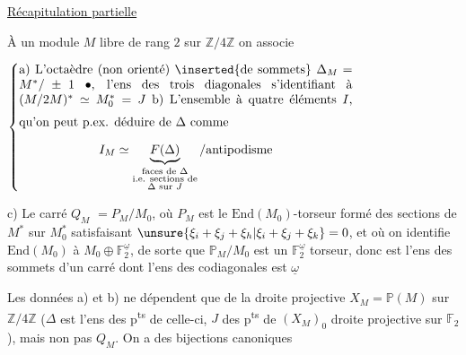\uline{Récapitulation partielle}

À un module $M$ libre de rang $2$ sur $\mathbb Z/4\mathbb Z$ on associe

\noindent{}\(\left\{\begin{minipage}{.77\linewidth}
a) L'octaèdre (non orienté) \inserted{de sommets} $\Delta_M=M^*/\pm1\ \bullet$, l'ens des trois diagonales s'identifiant à $(M/2M)^*\simeq M_0^*=J$

\medskip b) L'ensemble à quatre éléments $I$, qu'on peut p.ex. déduire de $\Delta$ comme
\[
 I_M\simeq\underbrace{F(\Delta)}_{\substack{\text{faces de }\Delta\\\text{i.e. sections de}\\\Delta\text{ sur }J}}/\text{antipodisme}
\]
\end{minipage}\right.\)

\reversemarginpar{}\normalmarginpar


\noindent\makebox[0pt][r]{\rule[-1.4ex]{.4pt}{4.6ex}\quad}c) Le carré $Q_M$   $=P_M/M_0$, où $P_M$ est le $\mathrm{End}(M_0)$-torseur formé des sections de $M^*$ sur $M_0^*$ satisfaisant $\unsure{\xi_i+\xi_j+\xi_h|\xi_i+\xi_j+\xi_k}=0$, et où on identifie $\mathrm{End}(M_0)$ à $M_0\oplus\mathbb F_2^{\underline\omega}$, de sorte que $\mathbb P_M/M_0$ est un $\mathbb F_2^{\underline\omega}$ torseur, donc est l'ens des sommets d'un carré  dont l'ens des codiagonales est $\underline\omega$

\reversemarginpar{}\normalmarginpar

Les données a) et b) ne dépendent que de la  droite projective $X_M=\mathbb P(M)$ sur $\mathbb Z/4\mathbb Z$ ($\Delta$ est l'ens des p\textsuperscript{ts} de celle-ci, $J$  des p\textsuperscript{ts} de $(X_M)_0$ droite projective sur $\mathbb F_2$), mais non pas $Q_M$. On a des bijections canoniques


